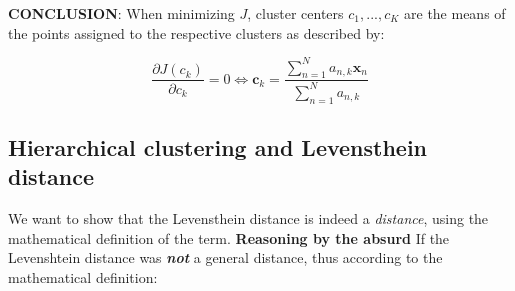 \documentclass{article}
\begin{document}
\textbf{CONCLUSION}: When minimizing $J$, cluster centers ${c_1,...,c_K}$ are the means of the points assigned to the respective clusters as described by:

\begin{equation} \label{eq4}
\boxed{
\frac{\partial J(c_k)}{\partial c_k} = 0 \Longleftrightarrow \mathbf{c}_k = \frac{\sum\limits_{n=1}^{N}a_{n,k}\mathbf{x}_n}{\sum\limits_{n=1}^{N}a_{n,k}}
}
\end{equation}

\subsection{Hierarchical clustering and Levensthein distance}
We want to show that the Levensthein distance is indeed a \textit{distance}, using the mathematical definition of the term.
\newline
\newline \textbf{Reasoning by the absurd}
\newline If the Levenshtein distance was \textit{\textbf{not}} a general distance, thus according to the mathematical definition:
\end{document}
